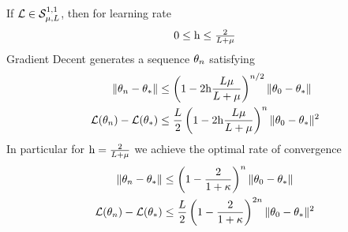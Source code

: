 \begin{theorem}
	If \(\mathcal{L}\in\mathcal{S}^{1,1}_{{\mu},{L}}\), then for learning rate
	\[0 \le \text{h} \le \tfrac{2}{L+\mu}\]
	Gradient Decent generates a sequence \(\theta_n\) satisfying
	\begin{subequations}
	\begin{align}
		\label{eq: gd strong convexity convergence rate 1}
		\|\theta_n - \theta_*\|
		&\le \left(
			1- 2\text{h}\frac{L\mu}{L+\mu}
		\right)^{n/2}
		\|\theta_0 - \theta_*\| \\
		\label{eq: gd strong convexity convergence rate 2}
		\mathcal{L}(\theta_n) - \mathcal{L}(\theta_*)
		&\le \frac{L}{2} \left(
			1- 2\text{h}\frac{L\mu}{L+\mu}
		\right)^{n}
		\|\theta_0 - \theta_*\|^2
	\end{align}
	\end{subequations}
	In particular for \(\text{h}=\tfrac2{L+\mu}\) we achieve the optimal
	rate of convergence
	\begin{subequations}\label{eq: gd strong convexity optimal rate}
	\begin{align}
		\|\theta_n - \theta_*\|
		&\le \left(
			1- \frac{2}{1+\kappa}
		\right)^n
		\|\theta_0 - \theta_*\| \\
		\mathcal{L}(\theta_n) - \mathcal{L}(\theta_*)
		&\le \frac{L}{2} \left(
			1- \frac{2}{1+\kappa}
		\right)^{2n}
		\|\theta_0 - \theta_*\|^2
	\end{align}
	\end{subequations}
\end{theorem}
